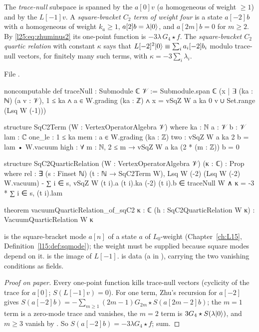 \begin{definition}\label{l25:def:sqc2}
The \emph{trace-null} subspace is spanned by the $a[0]v$ ($a$ homogeneous of weight $\ge1$) and by the $L[-1]v$. A
\emph{square-bracket $C_2$ term of weight four} is a state $a[-2]b$ with $a$ homogeneous of weight $k_a\ge1$,
$a[2]b=\lambda|0\rangle$, and $a[2m]b=0$ for $m\ge2$. By \eqref{l25:eq:zhuminus2} its one-point function is
$-3\lambda\,G_4\star f$. The \emph{square-bracket $C_2$ quartic relation} with constant $\kappa$ says that
$L[-2]^2|0\rangle\equiv\sum_ia_i[-2]b_i$ modulo trace-null vectors, for finitely many such terms, with
$\kappa=-3\sum_i\lambda_i$.
\end{definition}
\noindent File .
\begin{leancode}
noncomputable def traceNull : Submodule ℂ 𝒱 :=
  Submodule.span ℂ ({x | ∃ (ka : ℕ) (a v : 𝒱), 1 ≤ ka ∧ a ∈ W.grading (ka : ℤ) ∧ x = vSqZ W a ka 0 v}
    ∪ Set.range (Lsq W (-1)))

structure SqC2Term (W : VertexOperatorAlgebra 𝒱) where
  ka : ℕ
  a : 𝒱
  b : 𝒱
  lam : ℂ
  one_le : 1 ≤ ka
  mem : a ∈ W.grading (ka : ℤ)
  two : vSqZ W a ka 2 b = lam • W.vacuum
  high : ∀ m : ℕ, 2 ≤ m → vSqZ W a ka (2 * (m : ℤ)) b = 0

structure SqC2QuarticRelation (W : VertexOperatorAlgebra 𝒱) (κ : ℂ) : Prop where
  rel : ∃ (s : Finset ℕ) (t : ℕ → SqC2Term W),
    Lsq W (-2) (Lsq W (-2) W.vacuum) - ∑ i ∈ s, vSqZ W (t i).a (t i).ka (-2) (t i).b
        ∈ traceNull W
      ∧ κ = -3 * ∑ i ∈ s, (t i).lam

theorem vacuumQuarticRelation_of_sqC2 {κ : ℂ} (h : SqC2QuarticRelation W κ) :
    VacuumQuarticRelation W κ
\end{leancode}
\begin{dictionary}
 is the square-bracket mode $a[n]$ of a state $a$ of $L_0$-weight 
(Chapter~\ref{ch:L15}, Definition~\ref{l15:def:sqmode}); the weight must be supplied because square modes depend
on it.  is the image of $L[-1]$.  is data (a  in
), carrying the two vanishing conditions as fields.
\end{dictionary}
\begin{proof}[Proof on paper]
Every one-point function kills trace-null vectors (cyclicity of the trace for $a[0]$; $S(L[-1]v)=0$). For one term,
Zhu's recursion for $a[-2]$ gives $S(a[-2]b)=-\sum_{m\ge1}(2m-1)G_{2m}\star S(a[2m-2]b)$; the $m=1$ term is a
zero-mode trace and vanishes, the $m=2$ term is $3G_4\star S(\lambda|0\rangle)$, and $m\ge3$ vanish by
. So $S(a[-2]b)=-3\lambda G_4\star f$; sum.
\end{proof}
